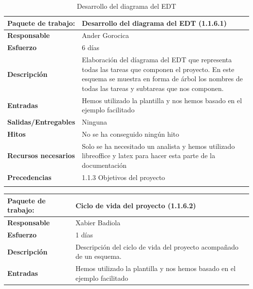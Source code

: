 \documentclass{report}
\begin{document}
\begin{center}
\begin{longtable}{|p{6cm}|p{6cm}|}
                \end{longtable}
                \begin{longtable}{|p{6cm}|p{6cm}|}
                    \hline
                    \textbf{Paquete de trabajo:} & Desarrollo del diagrama del EDT (1.1.6.1)\\
                    \hline
                    \textbf{Responsable} & Ander Gorocica\\
                    \hline
                    \textbf{Esfuerzo} & 6 días\\
                    \hline
                    \textbf{Descripción} & Elaboración del díagrama del EDT que representa todas las tareas que componen el proyecto. En este esquema se muestra en forma de árbol los nombres de todas las tareas y subtareas que nos componen.\\
                    \hline
                    \textbf{Entradas} & Hemos utilizado la plantilla y nos hemos basado en el ejemplo facilitado\\
                    \hline
                    \textbf{Salidas/Entregables} & Ninguna\\
                    \hline
                    \textbf{Hitos} & No se ha conseguido ningún hito\\
                    \hline
                    \textbf{Recursos necesarios} & Solo se ha necesitado un analista y hemos utilizado libreoffice y latex para hacer esta parte de la documentación\\
                    \hline
                    \textbf{Precedencias} & 1.1.3 Objetivos del proyecto\\
                    \hline
                    \caption{Desarrollo del diagrama del EDT}
                \end{longtable}
                \clearpage
                \begin{longtable}{|p{6cm}|p{6cm}|}
                    \hline
                    \textbf{Paquete de trabajo:} & Ciclo de vida del proyecto (1.1.6.2)\\
                    \hline
                    \textbf{Responsable} & Xabier Badiola\\
                    \hline
                    \textbf{Esfuerzo} & 1 días\\
                    \hline
                    \textbf{Descripción} & Descripción del ciclo de vida del proyecto acompañado de un esquema.\\
                    \hline
                    \textbf{Entradas} & Hemos utilizado la plantilla y nos hemos basado en el ejemplo facilitado\\

\end{longtable}
\end{center}
\end{document}
